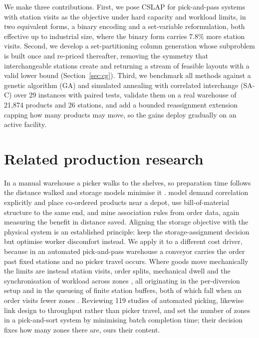 \documentclass[]{interact}
\begin{document}
We make three contributions. First, we pose CSLAP for pick-and-pass systems with station visits as the objective under hard capacity and workload limits, in two equivalent forms, a binary encoding and a set-variable reformulation, both effective up to industrial size, where the binary form carries 7.8\% more station visits. Second, we develop a set-partitioning column generation whose subproblem is built once and re-priced thereafter, removing the symmetry that interchangeable stations create and returning a stream of feasible layouts with a valid lower bound (Section~\ref{sec:cg}). Third, we benchmark all methods against a genetic algorithm (GA) and simulated annealing with correlated interchange (SA-C) over 29 instances with paired tests, validate them on a real warehouse of 21,874 products and 26 stations, and add a bounded reassignment extension capping how many products may move, so the gains deploy gradually on an active facility.

\section{Related production research}\label{sec:litreview}
In a manual warehouse a picker walks to the shelves, so preparation time follows the distance walked and storage models minimise it \citep{islam2023, wang2020}. \citet{zhang2019cie} model demand correlation explicitly and place co-ordered products near a depot, \citet{xiao2010correlated} use bill-of-material structure to the same end, and \citet{pang2017datamining} mine association rules from order data, again measuring the benefit in distance saved. Aligning the storage objective with the physical system is an established principle: \citet{larco2017discomfort} keep the storage-assignment decision but optimise worker discomfort instead. We apply it to a different cost driver, because in an automated pick-and-pass warehouse a conveyor carries the order past fixed stations and no picker travel occurs. Where goods move mechanically the limits are instead station visits, order splits, mechanical dwell and the synchronisation of workload across zones \citep{azadeh2019, xie2021}, all originating in the per-diversion setup and in the queueing of finite station buffers, both of which fall when an order visits fewer zones \citep{zhu2021, kim2020}. Reviewing 119 studies of automated picking, \citet{jaghbeer2020automated} likewise link design to throughput rather than picker travel, and \citet{dekoster2012zones} set the number of zones in a pick-and-sort system by minimising batch completion time; their decision fixes how many zones there are, ours their content.
\end{document}
